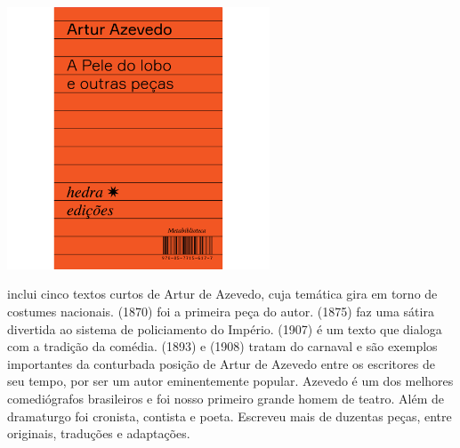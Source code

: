 \hspace*{-.4cm}\begin{minipage}[c]{.6\linewidth}
\small{
{}}
\end{minipage}

\pagebreak

\begin{center}
\hspace*{.5cm}\includegraphics[width=78mm]{./grid/azevedo.jpg}
\end{center}

\hspace*{-7cm}\hrulefill\hspace*{-7cm}

\medskip

 inclui cinco textos curtos de Artur de Azevedo, cuja temática gira em torno de costumes nacionais. {} (1870) foi a primeira peça do autor. {} (1875) faz uma sátira divertida ao sistema de policiamento do Império. {} (1907) é um texto que dialoga com a tradição da comédia. {} (1893) e {} (1908) tratam do carnaval e são exemplos importantes da conturbada posição de Artur de Azevedo entre os escritores de seu tempo, por ser um autor eminentemente popular. Azevedo é um dos melhores comediógrafos brasileiros e foi nosso primeiro grande homem de teatro. Além de dramaturgo foi cronista, contista e poeta. Escreveu mais de duzentas peças, entre originais, traduções e adaptações.


